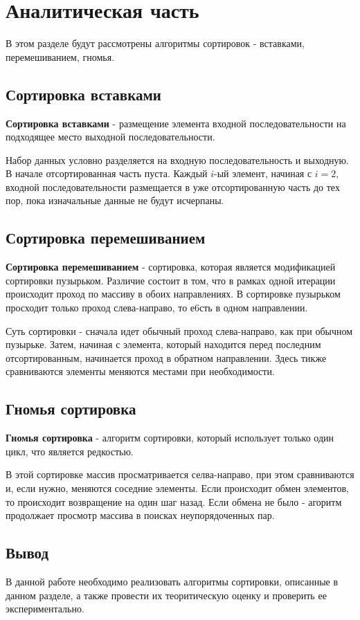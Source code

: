 \chapter{Аналитическая часть}
В этом разделе будут рассмотрены алгоритмы сортировок - вставками, перемешиванием, гномья.

\section{Сортировка вставками}
\textbf{Сортировка вставками} \cite{insertion-sort} - размещение элемента входной последовательности на подходящее место выходной последовательности.

Набор данных условно разделяется на входную последовательность и выходную. В начале отсортированная часть пуста. Каждый $i$-ый элемент, начиная с $i = 2$, входной последовательности размещается в уже отсортированную часть до тех пор, пока изначальные данные не будут исчерпаны.


\section{Сортировка перемешиванием}
\textbf{Сортировка перемешиванием} \cite{sheyker-sort} - сортировка, которая является модификацией сортировки пузырьком. Различие состоит в том, что в рамках одной итерации происходит проход по массиву в обоих направлениях. В сортировке пузырьком просходит только проход слева-направо, то е6сть в одном направлении.

Суть сортировки - сначала идет обычный проход слева-направо, как при обычном пузырьке. Затем, начиная с элемента, который находится перед последним отсортированным, начинается проход в обратном направлении. Здесь тикже сравниваются элементы меняются местами при необходимости.


\section{Гномья сортировка}
\textbf{Гномья сортировка} \cite{gnomme-sort} - алгоритм сортировки, который использует только один цикл, что является редкостью.

В этой сортировке массив просматривается селва-направо, при этом сравниваются и, если нужно, меняются соседние элементы. Если происходит обмен элементов, то происходит возвращение на один шаг назад. Если обмена не было - агоритм продолжает просмотр массива в поисках неупорядоченных пар.

\section*{Вывод}
В данной работе необходимо реализовать алгоритмы сортировки, описанные в данном разделе, а также провести их теоритическую оценку и проверить ее экспериментально.